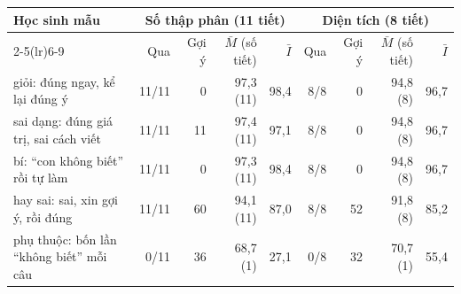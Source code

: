 \small
\begin{tabular}{@{}lrrrrrrrr@{}}
\toprule
\multirow{2}{*}{Học sinh mẫu} & \multicolumn{4}{c}{Số thập phân (11 tiết)} & \multicolumn{4}{c}{Diện tích (8 tiết)} \\
\cmidrule(lr){2-5}\cmidrule(lr){6-9}
 & Qua & Gợi ý & $\bar M$ (số tiết) & $\bar I$ & Qua & Gợi ý & $\bar M$ (số tiết) & $\bar I$ \\
\midrule
giỏi: đúng ngay, kể lại đúng ý & 11/11 & 0 & 97,3 (11) & 98,4 & 8/8 & 0 & 94,8 (8) & 96,7 \\
sai dạng: đúng giá trị, sai cách viết & 11/11 & 11 & 97,4 (11) & 97,1 & 8/8 & 0 & 94,8 (8) & 96,7 \\
bí: ``con không biết'' rồi tự làm & 11/11 & 0 & 97,3 (11) & 98,4 & 8/8 & 0 & 94,8 (8) & 96,7 \\
hay sai: sai, xin gợi ý, rồi đúng & 11/11 & 60 & 94,1 (11) & 87,0 & 8/8 & 52 & 91,8 (8) & 85,2 \\
phụ thuộc: bốn lần ``không biết'' mỗi câu & 0/11 & 36 & 68,7 (1) & 27,1 & 0/8 & 32 & 70,7 (1) & 55,4 \\
\bottomrule
\end{tabular}
